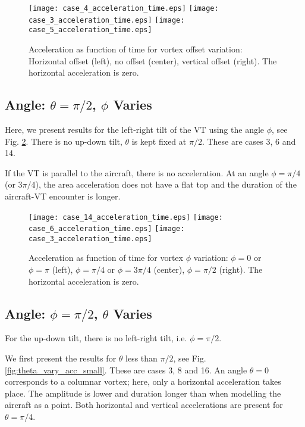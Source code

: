 \documentclass[smallextended]{svjour3}       %
\begin{document}
\begin{figure}
\texttt{[image: case\_4\_acceleration\_time.eps]}
\hspace{0.5cm}
\texttt{[image: case\_3\_acceleration\_time.eps]}
\hspace{0.5cm}
\texttt{[image: case\_5\_acceleration\_time.eps]}
\caption{Acceleration as function of time for vortex offset variation: Horizontal offset (left), no offset (center), vertical offset (right). The horizontal acceleration is zero.}
\label{fig:offset_acc}
\end{figure}

\subsection{Angle: $\theta=\pi/2$, $\phi$ Varies}

Here, we present results for the left-right tilt of the VT using the angle $\phi$, see Fig. \ref{fig:phi_vary_acc_small}. There is no up-down tilt, $\theta$ is kept fixed at $\pi/2$. These are cases 3, 6 and 14.

If the VT is parallel to the aircraft, there is no acceleration. At an angle $\phi=\pi/4$ (or $3\pi/4$), the area acceleration does not have a flat top and the duration of the aircraft-VT encounter is longer.

\begin{figure}
\texttt{[image: case\_14\_acceleration\_time.eps]}
\hspace{0.5cm}
\texttt{[image: case\_6\_acceleration\_time.eps]}
\hspace{0.5cm}
\texttt{[image: case\_3\_acceleration\_time.eps]}
\caption{Acceleration as function of time for vortex $\phi$ variation: $\phi=0$ or $\phi=\pi$ (left), $\phi=\pi/4$ or $\phi=3\pi/4$ (center), $\phi=\pi/2$ (right). The horizontal acceleration is zero.}
\label{fig:phi_vary_acc_small}
\end{figure}

\subsection{Angle: $\phi=\pi/2$, $\theta$ Varies}

For the up-down tilt, there is no left-right tilt, i.e. $\phi=\pi/2$.

We first present the results for $\theta$ less than $\pi/2$, see Fig. \ref{fig:theta_vary_acc_small}. These are cases 3, 8 and 16. An angle $\theta=0$ corresponds to a columnar vortex; here, only a horizontal acceleration takes place. The amplitude is lower and duration longer than when modelling the aircraft as a point. Both horizontal and vertical accelerations are present for $\theta=\pi/4$.
\end{document}
